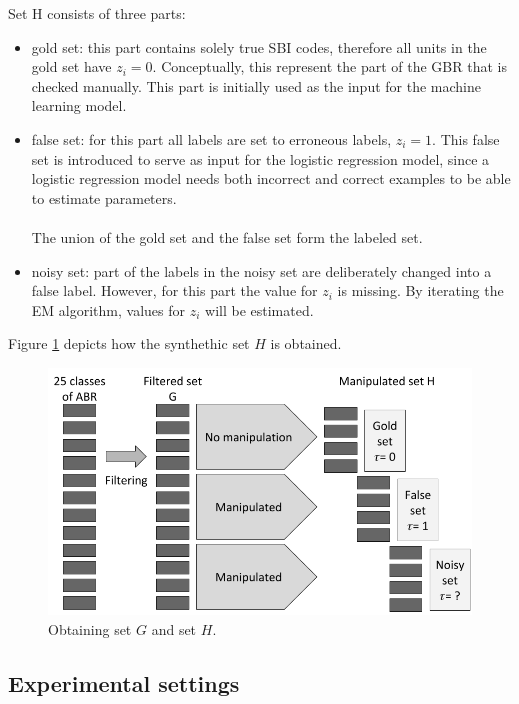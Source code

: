 \documentclass[12pt, a4paper, titlepage]{article}
\begin{document}
Set H consists of three parts:
\begin{itemize}
\item gold set: this part contains solely true SBI codes, therefore all units in the gold set have $z_i = 0$. Conceptually, this represent the part of the GBR that is checked manually. This part is initially used as the input for the machine learning model.
\item false set: for this part all labels are set to erroneous labels, $z_i = 1$. This false set is introduced to serve as input for the logistic regression model, since a logistic regression model needs both incorrect and correct examples to be able to estimate parameters.\\
\\
The union of the gold set and the false set form the labeled set.
\item noisy set: part of the labels in the noisy set are deliberately changed into a false label. However, for this part the value for $z_i$ is missing. By iterating the EM algorithm, values for $z_i$ will be estimated.
\end{itemize}

Figure \ref{fig1} depicts how the synthethic set $H$ is obtained.

\begin{figure}[h]
\includegraphics[width=\linewidth]{Synthethic set2}
\caption{Obtaining set $G$ and set $H$.}
\label{fig1}
\end{figure}

					\subsection{Experimental settings}
					\label{section:settings}
\end{document}
